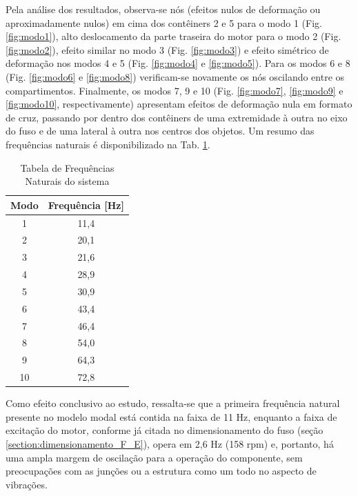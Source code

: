 Pela análise dos resultados, observa-se nós (efeitos nulos de deformação ou aproximadamente nulos) em cima dos contêiners 2 e 5 para o modo 1 (Fig. \ref{fig:modo1}), alto deslocamento da parte traseira do motor para o modo 2 (Fig. \ref{fig:modo2}), efeito similar no modo 3 (Fig. \ref{fig:modo3}) e efeito simétrico de deformação nos modos 4 e 5 (Fig. \ref{fig:modo4} e \ref{fig:modo5}). Para os modos 6 e 8 (Fig. \ref{fig:modo6} e \ref{fig:modo8}) verificam-se novamente os nós oscilando entre os compartimentos. Finalmente, os modos 7, 9 e 10 (Fig. \ref{fig:modo7}, \ref{fig:modo9} e \ref{fig:modo10}, respectivamente) apresentam efeitos de deformação nula em formato de cruz, passando por dentro dos contêiners de uma extremidade à outra no eixo do fuso e de uma lateral à outra nos centros dos objetos.  Um resumo das frequências naturais é disponibilizado na Tab. \ref{tab:modos}. 
\begin{table}[ht]
    \centering
    \footnotesize
    \caption{Tabela de Frequências Naturais do sistema}
    \label{tab:modos}
    \begin{adjustbox}{max width = \textwidth}
        \begin{tabular}{|c|c|}
            \hline
            \rowcolor[HTML]{A8DADC}
            \textbf{Modo} & \textbf{Frequência [Hz]}  \\ \hline
            1 & 11,4 \\ 
            \hline
            2 & 20,1 \\
            \hline
            3 & 21,6 \\
            \hline
            4 & 28,9 \\
            \hline
            5 & 30,9 \\
            \hline
            6 & 43,4 \\
            \hline
            7 & 46,4 \\
            \hline
            8 & 54,0 \\
            \hline
            9 & 64,3 \\
            \hline
            10 & 72,8 \\
            \hline
        \end{tabular}
    \end{adjustbox}
\end{table}

Como efeito conclusivo ao estudo, ressalta-se que a primeira frequência natural presente no modelo modal está contida na faixa de 11 Hz, enquanto a faixa de excitação do motor, conforme já citada no dimensionamento do fuso (seção \ref{section:dimensionamento_F_E}), opera em 2,6 Hz (158 rpm) e, portanto, há uma ampla margem de oscilação para a operação do componente, sem preocupações com as junções ou a estrutura como um todo no aspecto de vibrações. 

